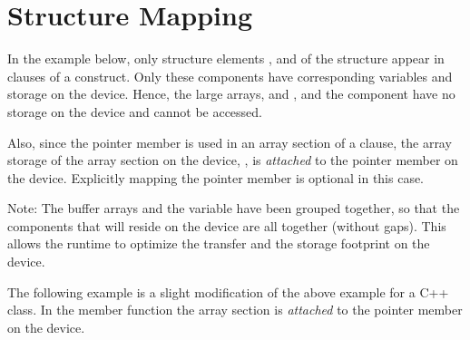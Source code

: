 \pagebreak
\section{Structure Mapping}
\label{sec:structure_mapping}


In the example below, only structure elements ,  and  
of the  structure appear in  clauses of a  construct.
Only these components have corresponding variables and storage on the device.  
Hence, the large arrays,  and , and the  component have no storage 
on the device and cannot be accessed.  

Also, since the pointer member  is used in an array section of a 
 clause, the array storage of the array section on the device, 
, is \emph{attached} to the pointer member  on the device.
Explicitly mapping the pointer member  is optional in this case.

Note: The buffer arrays and the  variable have been grouped together, so that
the components that will reside on the device are all together (without gaps).
This allows the runtime to optimize the transfer and the storage footprint on the device.



The following example is a slight modification of the above example for 
a C++ class.  In the member function  
the array section  is \emph{attached} to the pointer member 
on the device.
 


%
%

